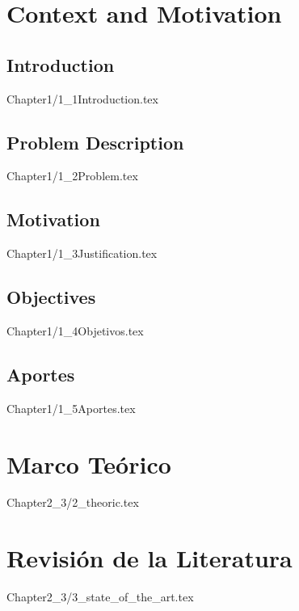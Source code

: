 \documentclass{report}
\begin{document}

\tableofcontents

\chapter{Context and Motivation}

\section*{Introduction}
{Chapter1/1_1Introduction.tex}

\section*{Problem Description}
{Chapter1/1_2Problem.tex}

\section*{Motivation}
{Chapter1/1_3Justification.tex}

\section*{Objectives}
{Chapter1/1_4Objetivos.tex}

\section*{Aportes}
{Chapter1/1_5Aportes.tex}


\chapter{Marco Teórico}
{Chapter2_3/2_theoric.tex}

\chapter{Revisión de la Literatura}
{Chapter2_3/3_state_of_the_art.tex}
\end{document}
